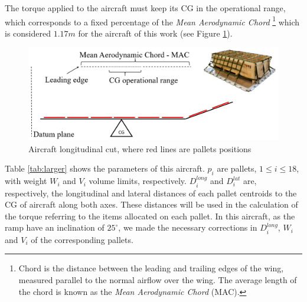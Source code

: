 \documentclass[preprint]{elsarticle}
\begin{document}
The torque applied to the aircraft must keep its CG in the operational range, which corresponds to a fixed percentage of the {\it Mean Aerodynamic Chord} \footnote{Chord is the distance between the leading and trailing edges of the wing, measured parallel to the normal airflow over the wing. The average length of the chord is known as the {\it Mean Aerodynamic Chord} (MAC).} which is considered $1.17m$ for the aircraft of this work (see Figure \ref{fig:lateral}).


\begin{figure}[H]
	\centering
	\includegraphics[scale=0.22]{Images/lateral.png}
	\caption{Aircraft longitudinal cut, where red lines are pallets positions}
	\label{fig:lateral}
\end{figure}

Table \ref{tab:larger} shows the parameters of this aircraft. $p_i$\/ are pallets, $1\leq i \leq 18$, with weight $W_i$\/ and $V_i$\/ volume limits, respectively. $D_i^{long}$\/ and $D_i^{lat}$\/ are, respectively, the longitudinal and lateral distances of each pallet centroids to the CG of aircraft along both axes. These distances will be used in the calculation of the torque referring to the items allocated on each pallet. In this aircraft, as the ramp have an inclination of $25^{\circ}$, we made the necessary corrections in $D_i^{long}$, $W_i$\/ and $V_i$\/ of the corresponding pallets.
\end{document}
